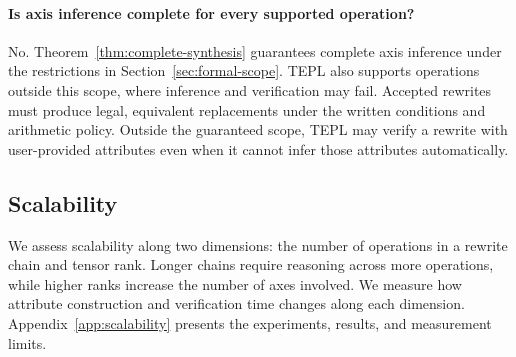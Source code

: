 \paragraph{Is axis inference complete for every supported operation?}
No. Theorem~\ref{thm:complete-synthesis} guarantees complete axis
inference under the restrictions in Section~\ref{sec:formal-scope}.
TEPL also supports operations outside this scope, where inference
and verification may fail.
Accepted rewrites must produce legal, equivalent replacements
under the written conditions and arithmetic policy.
Outside the guaranteed scope, TEPL may verify a rewrite with
user-provided attributes even when it cannot infer those attributes
automatically.

\FloatBarrier
\subsection{Scalability}
We assess scalability along two dimensions: the number of operations in a
rewrite chain and tensor rank. Longer chains require reasoning across more
operations, while higher ranks increase the number of axes involved.
We measure how attribute construction and verification time changes along
each dimension. Appendix~\ref{app:scalability} presents the experiments,
results, and measurement limits.
